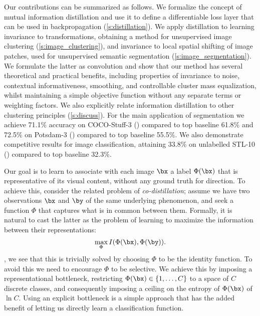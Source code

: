 Our contributions can be summarized as follows. We formalize the concept of mutual information distillation and use it to define a differentiable loss layer that can be used in backpropagation (\cref{s:distillation}). We apply distillation to learning invariance to transformations, obtaining a method for unsupervised image clustering (\cref{s:image_clustering}), and invariance to local spatial shifting of image patches, used for unsupervised semantic segmentation (\cref{s:image_segmentation}). We formulate the latter as convolution and show that our method has several theoretical and practical benefits, including properties of invariance to noise, contextual informativeness, smoothing, and controllable cluster mass equalization, whilst maintaining a simple objective function without any separate terms or weighting factors. We also explicitly relate information distillation to other clustering principles (\cref{s:discuss}). For the main application of segmentation we achieve 71.1\% accuracy on COCO-Stuff-3 (\cite{caesar2016coco}) compared to top baseline 61.8\% and 72.5\% on Potsdam-3 (\cite{potsdam}) compared to top baseline 55.5\%. We also demonstrate competitive results for image classification, attaining 33.8\% on unlabelled STL-10 (\cite{coates2011analysis}) compared to top baseline 32.3\%. 






Our goal is to learn to associate with each image $\bx$ a label $\Phi(\bx)$ that is representative of its visual content, without any ground truth for direction.
To achieve this, consider the related problem of \textit{co-distillation}; assume we have two observations $\bx$ and $\by$ of the same underlying phenomenon, and seek a function $\Phi$ that captures what is in common between them. Formally, it is natural to cast the latter as the problem of learning to maximize the information between their representations:
\begin{equation}\label{scratch:e:info_orig}
\max_\Phi I(\Phi(\bx),\Phi(\by)).
\end{equation}
, we see that this is trivially solved by choosing $\Phi$ to be the identity function. To avoid this we need to encourage $\Phi$ to be selective. We achieve this by imposing a representational bottleneck, restricting $\Phi(\bx)\in\{1,\dots,C\}$ to a space of $C$ discrete classes, and consequently imposing a ceiling on the entropy of $\Phi(\bx)$ of $\ln{C}$. Using an explicit bottleneck is a simple approach that has the added benefit of letting us directly learn a classification function.

